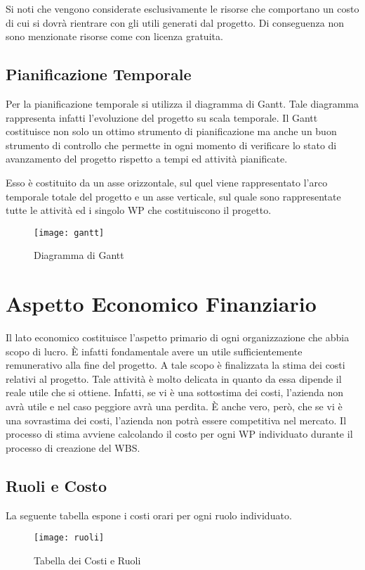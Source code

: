 Si noti che vengono considerate esclusivamente le risorse che comportano un costo di cui si dovrà rientrare con gli utili generati dal progetto. Di conseguenza non sono menzionate risorse come  con licenza gratuita.





\subsection{Pianificazione Temporale}
Per la pianificazione temporale si utilizza il diagramma di Gantt.
Tale diagramma rappresenta infatti l'evoluzione del progetto su scala temporale. Il Gantt costituisce non solo un ottimo strumento di pianificazione ma anche un buon strumento di controllo che permette in ogni momento di verificare lo stato di avanzamento del progetto rispetto a tempi ed attività pianificate.


Esso è costituito da un asse orizzontale, sul quel viene rappresentato l'arco temporale totale del progetto e un asse verticale, sul quale sono rappresentate tutte le attività ed i singolo WP che costituiscono il progetto.

\clearpage

\begin{figure}[!h]
  \texttt{[image: gantt]}	
  	\label{fig:gantt}
	\caption{Diagramma di Gantt}
\end{figure}



\section{Aspetto Economico Finanziario}
Il lato economico costituisce l'aspetto primario di ogni organizzazione che abbia scopo di lucro.
È infatti fondamentale avere un utile sufficientemente remunerativo alla fine del progetto. A tale scopo è finalizzata la stima dei costi relativi al progetto. Tale attività è molto delicata in quanto da essa dipende il reale utile che si ottiene. Infatti, se vi è una sottostima dei costi, l'azienda non avrà utile e nel caso peggiore avrà una perdita. È anche vero, però, che se vi è una sovrastima dei costi, l'azienda non potrà essere competitiva nel mercato.
Il processo di stima avviene calcolando il costo per ogni WP individuato durante il processo di creazione del WBS.
\subsection{Ruoli e Costo }
La seguente tabella espone i costi orari per ogni ruolo individuato.
\begin{figure}[!htb]
\centering
  \texttt{[image: ruoli]}	
  	\label{fig:ruoli}
	\caption{Tabella dei Costi e Ruoli}
\end{figure}

